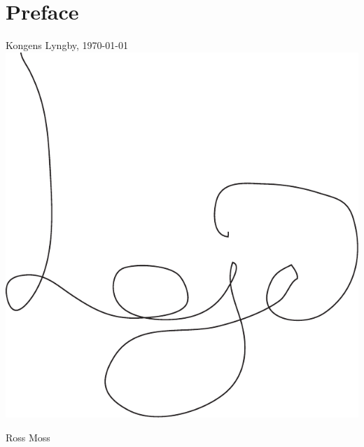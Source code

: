 
\chapter{Preface}
\blindtext[2]

\vfill

{
\centering
    Kongens Lyngby, \mydate\today\\[.5cm]
    \includegraphics[scale=0.2]{graphics/Signature.pdf}\\[.5cm]
\begin{center}
    Ross Moss
\end{center}
}